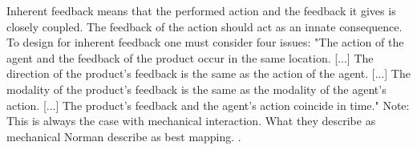 Inherent feedback means that the performed action and the feedback it gives is closely coupled. The feedback of the action should act as an innate consequence. To design for inherent feedback one must consider four issues: "The action of the agent and the feedback of the product occur in the
same location. [...] The direction of the product's feedback is the same as the action of
the agent. [...] The modality of the product's feedback is the same as the modality
of the agent's action. [...] The product's feedback and the agent's action coincide in time."
Note: This is always the case with mechanical interaction. What they describe as mechanical Norman describe as best mapping.
\cite{howdonald}.

\cite{frogger}




\newpage
